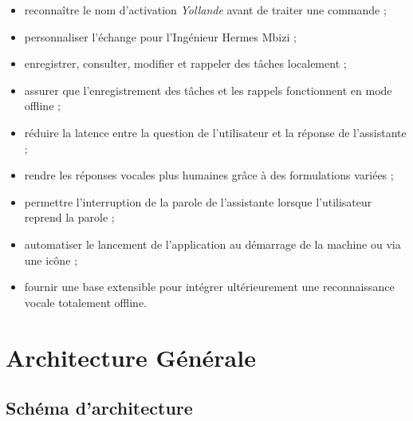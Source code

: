 \documentclass[12pt,a4paper]{report}
\begin{document}
\begin{itemize}[label=--]
  \item reconnaître le nom d'activation \textit{Yollande} avant de traiter une commande ;
  \item personnaliser l'échange pour l'Ingénieur Hermes Mbizi ;
  \item enregistrer, consulter, modifier et rappeler des tâches localement ;
  \item assurer que l'enregistrement des tâches et les rappels fonctionnent en mode offline ;
  \item réduire la latence entre la question de l'utilisateur et la réponse de l'assistante ;
  \item rendre les réponses vocales plus humaines grâce à des formulations variées ;
  \item permettre l'interruption de la parole de l'assistante lorsque l'utilisateur reprend la parole ;
  \item automatiser le lancement de l'application au démarrage de la machine ou via une icône ;
  \item fournir une base extensible pour intégrer ultérieurement une reconnaissance vocale totalement offline.
\end{itemize}

\chapter{Architecture Générale}

\section{Schéma d'architecture}
\end{document}
